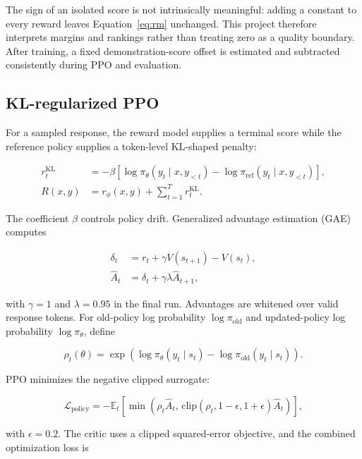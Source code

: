 \documentclass[11pt]{article}
\begin{document}
The sign of an isolated score is not intrinsically meaningful: adding a
constant to every reward leaves Equation~\ref{eq:rm} unchanged. This project
therefore interprets margins and rankings rather than treating zero as a
quality boundary. After training, a fixed demonstration-score offset is
estimated and subtracted consistently during PPO and evaluation.

\subsection{KL-regularized PPO}

For a sampled response, the reward model supplies a terminal score while the
reference policy supplies a token-level KL-shaped penalty:

\begin{align}
r_t^{\mathrm{KL}}
&=
-\beta\left[
\log \pi_\theta(y_t\mid x,y_{<t})
-
\log \pi_{\mathrm{ref}}(y_t\mid x,y_{<t})
\right],\\
R(x,y)
&=
r_\phi(x,y) + \sum_{t=1}^{T}r_t^{\mathrm{KL}}.
\label{eq:rlhf-reward}
\end{align}

The coefficient $\beta$ controls policy drift. Generalized advantage
estimation (GAE) computes

\begin{align}
\delta_t &= r_t + \gamma V(s_{t+1}) - V(s_t),\\
\hat{A}_t &= \delta_t + \gamma\lambda \hat{A}_{t+1},
\end{align}

with $\gamma=1$ and $\lambda=0.95$ in the final run. Advantages are whitened
over valid response tokens. For old-policy log probability
$\log\pi_{\mathrm{old}}$ and updated-policy log probability
$\log\pi_\theta$, define

\begin{equation}
\rho_t(\theta)
=
\exp\left(
\log\pi_\theta(y_t\mid s_t)
-
\log\pi_{\mathrm{old}}(y_t\mid s_t)
\right).
\end{equation}

PPO minimizes the negative clipped surrogate:

\begin{equation}
\mathcal{L}_{\mathrm{policy}}
=
-\mathbb{E}_t\left[
\min\left(
\rho_t\hat{A}_t,\,
\mathrm{clip}(\rho_t,1-\epsilon,1+\epsilon)\hat{A}_t
\right)
\right],
\label{eq:ppo}
\end{equation}

with $\epsilon=0.2$. The critic uses a clipped squared-error objective, and the
combined optimization loss is
\end{document}
